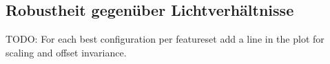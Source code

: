 \subsection{Robustheit gegenüber Lichtverhältnisse}
TODO: For each best configuration per featureset add a line in the plot for scaling and offset invariance.
